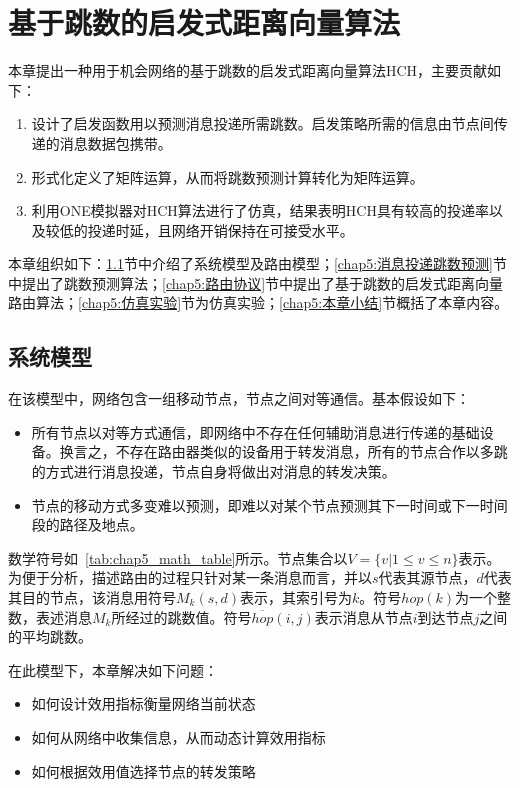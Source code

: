 \chapter{基于跳数的启发式距离向量算法}

本章提出一种用于机会网络的基于跳数的启发式距离向量算法HCH，主要贡献如下：

\begin{enumerate}
\item 设计了启发函数用以预测消息投递所需跳数。启发策略所需的信息由节点间传递的消息数据包携带。
\item 形式化定义了矩阵运算，从而将跳数预测计算转化为矩阵运算。
\item 利用ONE模拟器对HCH算法进行了仿真，结果表明HCH具有较高的投递率以及较低的投递时延，且网络开销保持在可接受水平。
\end{enumerate}

本章组织如下：\ref{chap5:系统模型}节中介绍了系统模型及路由模型；\ref{chap5:消息投递跳数预测}节中提出了跳数预测算法；\ref{chap5:路由协议}节中提出了基于跳数的启发式距离向量路由算法；\ref{chap5:仿真实验}节为仿真实验；\ref{chap5:本章小结}节概括了本章内容。


\section{系统模型}
\label{chap5:系统模型}

在该模型中，网络包含一组移动节点，节点之间对等通信。基本假设如下：
\begin{itemize}
\item 所有节点以对等方式通信，即网络中不存在任何辅助消息进行传递的基础设备。换言之，不存在路由器类似的设备用于转发消息，所有的节点合作以多跳的方式进行消息投递，节点自身将做出对消息的转发决策。
\item 节点的移动方式多变难以预测，即难以对某个节点预测其下一时间或下一时间段的路径及地点。
\end{itemize}

数学符号如\tablename~\ref{tab:chap5_math_table}所示。节点集合以$V=\{v|1\leq v\leq n\}$表示。为便于分析，描述路由的过程只针对某一条消息而言，并以$s$代表其源节点，$d$代表其目的节点，该消息用符号$M_k(s,d)$表示，其索引号为$k$。符号$hop(k)$为一个整数，表述消息$M_k$所经过的跳数值。符号$\overline{hop}(i,j)$表示消息从节点$i$到达节点$j$之间的平均跳数。

在此模型下，本章解决如下问题：
\begin{itemize}
\item 如何设计效用指标衡量网络当前状态
\item 如何从网络中收集信息，从而动态计算效用指标
\item 如何根据效用值选择节点的转发策略
\end{itemize}



